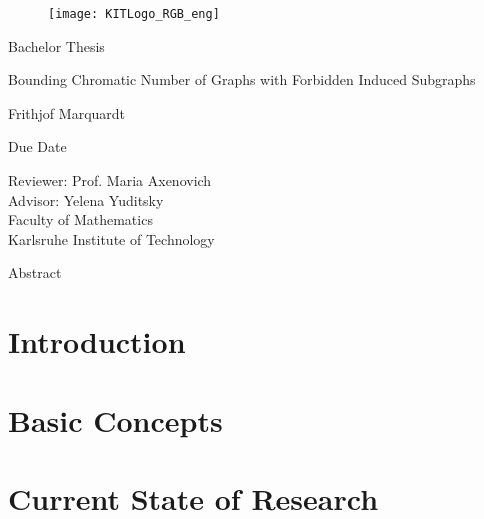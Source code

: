 \documentclass[12pt,a4paper]{scrartcl}
\theoremstyle{plain}
\theoremstyle{definition}
\numberwithin{equation}{section}
\begin{document}
  \pagestyle{empty}

  \begin{titlepage}

\begin{figure}[h]
\texttt{[image: KITLogo\_RGB\_eng]} 
\end{figure}
  
    \vspace*{2cm} 

 \begin{center} \large 
    
    Bachelor Thesis
    \vspace*{2cm}

    {\huge Bounding Chromatic Number of Graphs with Forbidden Induced Subgraphs}
    \vspace*{2.5cm}

    Frithjof Marquardt
    \vspace*{1.5cm}

    Due Date
    \vspace*{4cm}

	Reviewer: Prof. Maria Axenovich\\
    Advisor: Yelena Yuditsky \\[1cm]
    Faculty of Mathematics \\[1cm]
		Karlsruhe Institute of Technology
  \end{center}
\end{titlepage}

Abstract
  \newpage
  \tableofcontents

  \newpage
 


  \pagestyle{headings}

  \section{Introduction}\label{secIntro}
  
  \newpage
  
  \section{Basic Concepts}\label{secBC}
  
  \newpage 
  
  \section{Current State of Research}\label{secCR}
  
  \newpage
  
\end{document}
